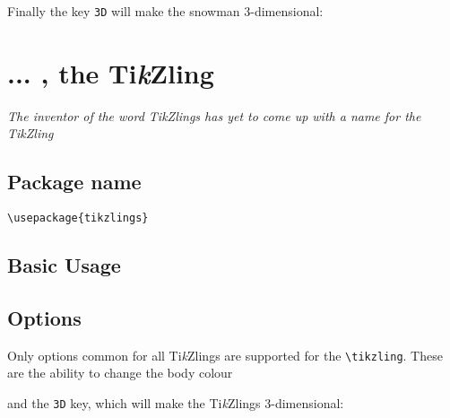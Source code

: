 \documentclass[parskip=half]{scrartcl}
\newcommand{\tikzlings}{Ti\emph{k}Zlings\xspace}
\begin{document}
Finally the key \lstinline|3D| will make the snowman 3-dimensional:

\begin{tcblisting}{}
\snowman[3D]
\end{tcblisting}

%
%
\clearpage
\section[Ti\emph{k}Zlings]{... , the Ti\emph{k}Zling}

\emph{The inventor of the word \tikzlings has yet to come up with a name for the Ti\emph{k}Zling}

\subsection{Package name}

\begin{tcolorbox}[lower separated=false, lefthand width=.8\linewidth]
\vspace*{0.5cm}
\lstinline|\usepackage{tikzlings}|
\vspace*{0.5cm}
\end{tcolorbox}

\subsection{Basic Usage}

\begin{tcblisting}{}
\tikzling
\end{tcblisting}

\subsection{Options}

Only options common for all \tikzlings are supported for the \lstinline|\tikzling|. These are the ability to change the body colour
\begin{tcblisting}{}
\tikzling[body=blue]
\end{tcblisting}

and the \lstinline|3D| key, which will make the Ti\emph{k}Zlings 3-dimensional:
\begin{tcblisting}{}
\tikzling[3D]
\end{tcblisting}
\end{document}
